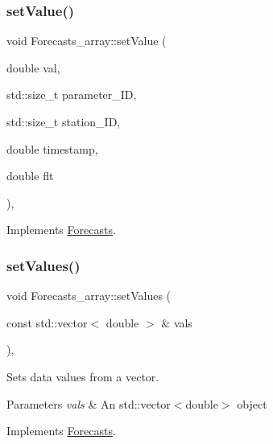 \subsubsection{\texorpdfstring{set\+Value()}{setValue()}\hspace{0.1cm}{\footnotesize\ttfamily [2/2]}}
{\footnotesize\ttfamily void Forecasts\+\_\+array\+::set\+Value (\begin{DoxyParamCaption}\item[{double}]{val,  }\item[{std\+::size\+\_\+t}]{parameter\+\_\+\+ID,  }\item[{std\+::size\+\_\+t}]{station\+\_\+\+ID,  }\item[{double}]{timestamp,  }\item[{double}]{flt }\end{DoxyParamCaption})\hspace{0.3cm}{\ttfamily [override]}, {\ttfamily [virtual]}}



Implements \mbox{\hyperlink{class_forecasts_a584820dc47f1b5c4cae099485ee59cbe}{Forecasts}}.

\mbox{\label{class_forecasts__array_af31e7741f2e048593cbec1c317210b65}} 
\subsubsection{\texorpdfstring{set\+Values()}{setValues()}}
{\footnotesize\ttfamily void Forecasts\+\_\+array\+::set\+Values (\begin{DoxyParamCaption}\item[{const std\+::vector$<$ double $>$ \&}]{vals }\end{DoxyParamCaption})\hspace{0.3cm}{\ttfamily [override]}, {\ttfamily [virtual]}}

Sets data values from a vector.


\begin{DoxyParams}{Parameters}
{\em vals} & An std\+::vector$<$double$>$ object \\
\hline
\end{DoxyParams}


Implements \mbox{\hyperlink{class_forecasts_ae2a59385e03dd372fef3dfe89f5a31cf}{Forecasts}}.

